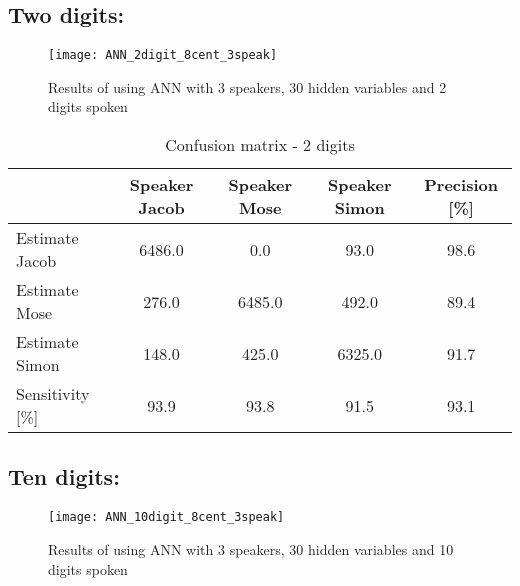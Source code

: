 \subsection{Two digits:}
\begin{figure}[H]
\centering
\texttt{[image: ANN\_2digit\_8cent\_3speak]}
\caption{Results of using ANN with 3 speakers, 30 hidden variables and 2 digits spoken}
\label{fig:ANN_fig_2}
\end{figure}

\begin{table}[H]                                                    
\centering                                                          
\begin{tabular}{|l|c|c|c|c|}                                        
\hline                                                              
  & Speaker Jacob & Speaker Mose & Speaker Simon & Precision [\%] \\
\hline                                                              
Estimate Jacob & 6486.0 & 0.0 & 93.0 & 98.6 \\                      
\hline                                                              
Estimate Mose & 276.0 & 6485.0 & 492.0 & 89.4 \\                    
\hline                                                              
Estimate Simon & 148.0 & 425.0 & 6325.0 & 91.7 \\                   
\hline                                                              
Sensitivity [\%] & 93.9 & 93.8 & 91.5 & 93.1 \\                     
\hline                                                              
\end{tabular}                                                       
\caption{Confusion matrix - 2 digits}                               
\label{table:ANN_conf_2}                                            
\end{table}



\subsection{Ten digits:}
\begin{figure}[H]
\centering
\texttt{[image: ANN\_10digit\_8cent\_3speak]}
\caption{Results of using ANN with 3 speakers, 30 hidden variables and 10 digits spoken}
\label{fig:ANN_fig_10}
\end{figure}

